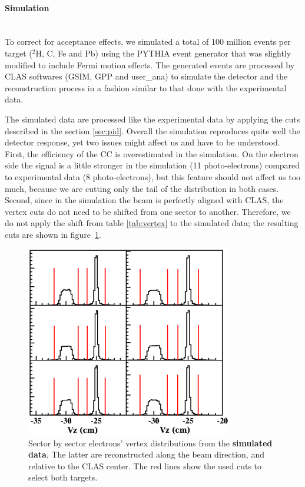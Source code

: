 \paragraph{Simulation} ~\\
To correct for acceptance effects, we simulated a total of 100 million events 
per target ($^2$H, C, Fe and Pb) using the PYTHIA \cite{Sjostrand:2006za} 
event generator that was slightly modified to include Fermi motion effects. The 
generated events are processed by CLAS softwares (GSIM, GPP and user\_ana) 
to simulate the detector and the reconstruction process in a fashion similar 
to that done with the experimental data.

The simulated data are processed like the experimental data by 
applying the cuts described in the section \ref{sec:pid}. Overall the 
simulation reproduces quite well the detector response, yet two issues might 
affect us and have to be understood. First, the efficiency of the CC is 
overestimated in the simulation. On the electron side the signal is a little stronger in the simulation (11 
photo-electrons) compared to experimental data (8 photo-electrons), but this 
feature should not affect us too much, because we are cutting only the tail of the 
distribution in both cases. Second, since in the simulation the beam is perfectly 
aligned with CLAS, the vertex cuts do not need to be shifted from one sector to 
another. Therefore, we do not apply the shift from table \ref{tab:vertex} to the 
simulated data; the resulting cuts are shown in figure~\ref{simvertex}.

\begin{figure}[tpb]
\centering
\includegraphics[width=9cm] {chap5-fig/Vertex_el_sim.png}
\caption {Sector by sector electrons' vertex distributions from the 
{\bf simulated data}. The latter are reconstructed along the beam direction, 
and relative to the CLAS center. The red lines show the used cuts to select 
both targets.}
\label{simvertex}
\end{figure}

